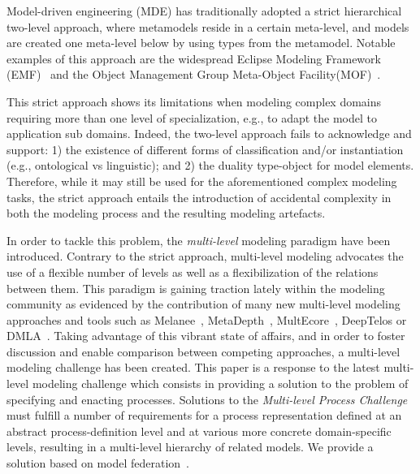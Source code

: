 Model-driven engineering (MDE) has traditionally adopted a strict hierarchical two-level approach, where metamodels reside in a certain meta-level, and models are created one meta-level below by using types from the metamodel. Notable examples of this approach are the widespread Eclipse Modeling Framework (EMF)~\citep{emf} and the Object Management Group Meta-Object Facility(MOF)~\citep{omg2013mof}.

This strict approach shows its limitations when modeling complex domains requiring more than one level of specialization, e.g., to adapt the model to application sub domains. Indeed, the two-level approach fails to acknowledge and support: 1) the existence of different forms of classification and/or instantiation (e.g., ontological vs linguistic); and 2) the duality type-object for model elements. Therefore, while it may still be used for the aforementioned complex modeling tasks, the strict approach entails the introduction of accidental complexity in both the modeling process and the resulting modeling artefacts. 

In order to tackle this problem, the \emph{multi-level} modeling paradigm have been introduced. Contrary to the strict approach, multi-level modeling advocates the use of a flexible number of levels as well as a flexibilization of the relations between them. This paradigm is gaining traction lately within the modeling community as evidenced by the contribution of many new multi-level modeling approaches and tools such as Melanee~\citep{melanee}, MetaDepth~\citep{metadepth}, MultEcore~\citep{multecore2016}, DeepTelos\citep{deeptelos2016} or DMLA~\citep{dmla2017}. Taking advantage of this vibrant state of affairs, and in order to foster discussion and enable comparison between competing approaches, a multi-level modeling challenge has been created. This paper is a response to the latest multi-level modeling challenge
which consists in providing a solution to the problem of specifying and enacting processes. Solutions to the \emph{Multi-level Process Challenge} must fulfill a number of requirements for a process representation defined at an abstract process-definition level and at various more concrete domain-specific levels, resulting in a multi-level hierarchy of related models. We provide a solution based on model federation~\citep{Golra2016-federation}.

